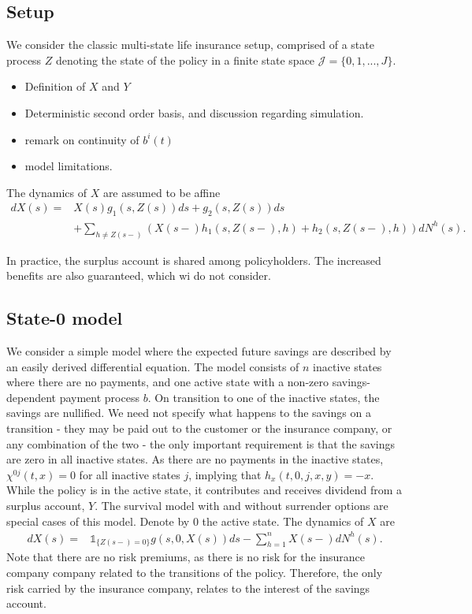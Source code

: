 \documentclass[12pt]{article}
\newcommand{\indic}[1]{\mathds{1}_{ \{ #1 \} }}
\begin{document}
\subsection*{Setup}
We consider the classic multi-state life insurance setup, comprised of a state process $Z$ denoting the state of the policy in a finite state space $\mathcal{J}=\{0,1,...,J\}$. 
\begin{itemize}
\item Definition of $X$ and $Y$
\item Deterministic second order basis, and discussion regarding simulation.
\item remark on continuity of $b^i(t)$
\item model limitations.
\end{itemize}
The dynamics of $X$ are assumed to be affine
\begin{align*}
dX(s)=&X(s)g_1(s,Z(s))ds+g_2(s,Z(s))ds\\
&+\sum_{h\neq Z(s-)} \left( X(s-)h_1(s,Z(s-),h)+ h_2(s,Z(s-),h)\right) dN^h(s).
\end{align*}

In practice, the surplus account is shared among policyholders. The increased benefits are also guaranteed, which wi do not consider.

\subsection*{State-0 model}
We consider a simple model where the expected future savings are described by an easily derived differential equation. The model consists of $n$ inactive states where there are no payments, and one active state with a non-zero savings-dependent payment process $b$. On transition to one of the inactive states, the savings are nullified. We need not specify what happens to the savings on a transition - they may be paid out to the customer or the insurance company, or any combination of the two - the only important requirement is that the savings are zero in all inactive states. As there are no payments in the inactive states, $\chi^{0j}(t,x)=0$ for all inactive states $j$, implying that $h_x(t,0,j,x,y)=-x$. While the policy is in the active state, it contributes and receives dividend from a surplus account, $Y$. The survival model with and without surrender options are special cases of this model. Denote by $0$ the active state. The dynamics of $X$ are
\begin{align*}
dX(s)=& \indic{Z(s-)=0}g(s,0,X(s))ds - \sum_{h=1}^n X(s-)dN^h(s).
\end{align*}
Note that there are no risk premiums, as there is no risk for the insurance company company related to the transitions of the policy. Therefore, the only risk carried by the insurance company, relates to the interest of the savings account.
\end{document}

